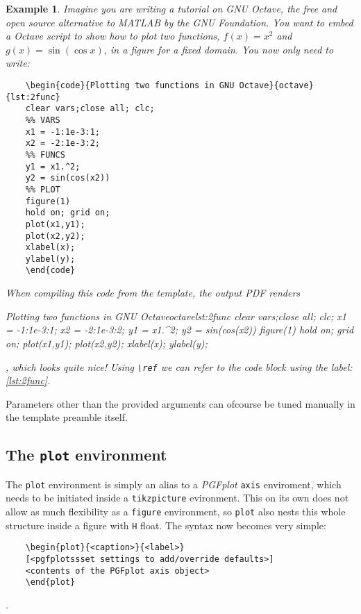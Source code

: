 \documentclass[leqno]{article}			%
\newenvironment{plot}[2]				%
	{
	\newcommand{\plotcap}{#1}			%
	\newcommand{\plotlab}{#2}			%
	\begin{figure}[H]					%
		\centering						%
		\begin{tikzpicture}				%
		\begin{axis}					%
	}
	{
		\end{axis}						%
		\end{tikzpicture}				%
	\caption{\plotcap}					%
	\label{\plotlab}					%
	\end{figure}						%
	}
\begin{document}
\newtheorem{exmp}{Example}[section]
\begin{exmp}
Imagine you are writing a tutorial on \textit{GNU Octave}, the free and open source alternative to \textit{MATLAB} by the GNU Foundation. You want to embed a Octave script to show how to plot two functions, $f(x) = x^{2}$ and $g(x) = \sin{(\cos{x})}$, in a figure for a fixed domain. You now only need to write:
\begin{verbatim}
	\begin{code}{Plotting two functions in GNU Octave}{octave}{lst:2func}
	clear vars;close all; clc;
	%% VARS
	x1 = -1:1e-3:1;
	x2 = -2:1e-3:2;
	%% FUNCS
	y1 = x1.^2;
	y2 = sin(cos(x2))
	%% PLOT
	figure(1)
	hold on; grid on;
	plot(x1,y1);
	plot(x2,y2);
	xlabel(x);
	ylabel(y);
	\end{code}
\end{verbatim}
When compiling this \LaTeXe code from the template, the output PDF renders
\begin{code}{Plotting two functions in GNU Octave}{octave}{lst:2func}
clear vars;close all; clc;
x1 = -1:1e-3:1;
x2 = -2:1e-3:2;
y1 = x1.^2;
y2 = sin(cos(x2))
figure(1)
hold on; grid on;
plot(x1,y1);
plot(x2,y2);
xlabel(x);
ylabel(y);
\end{code},
which looks quite nice! Using \verb!\ref! we can refer to the code block using the label: \ref{lst:2func}.
\end{exmp}

Parameters other than the provided arguments can ofcourse be tuned manually in the template preamble itself.

\subsection{The \texttt{plot} environment}
\label{ss:plot}
The \verb|plot| environment is simply an alias to a \textit{PGFplot}
\texttt{axis} enviroment, which needs to be initiated inside a
\texttt{tikzpicture} evironment. This on its own does not allow as much
flexibility as a \texttt{figure} environment, so \verb|plot| also nests this
whole structure inside a figure with \verb|H| float. The syntax now becomes
very simple:

\begin{verbatim}
	\begin{plot}{<caption>}{<label>}
	[<pgfplotssset settings to add/override defaults>]
	<contents of the PGFplot axis object>
	\end{plot}
\end{verbatim}.
\end{document}

